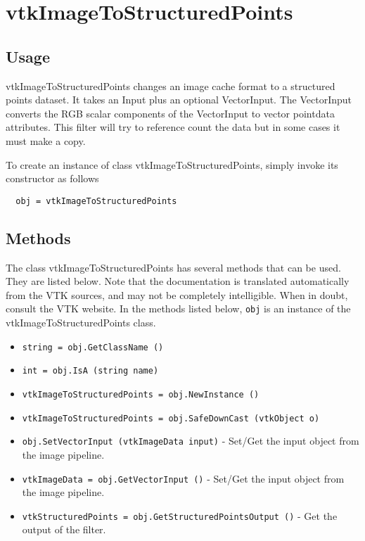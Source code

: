 \section{vtkImageToStructuredPoints}

\subsection{Usage}

 vtkImageToStructuredPoints changes an image cache format to
 a structured points dataset.  It takes an Input plus an optional
 VectorInput. The VectorInput converts the RGB scalar components
 of the VectorInput to vector pointdata attributes. This filter
 will try to reference count the data but in some cases it must
 make a copy.

To create an instance of class vtkImageToStructuredPoints, simply
invoke its constructor as follows
\begin{verbatim}
  obj = vtkImageToStructuredPoints
\end{verbatim}
\subsection{Methods}

The class vtkImageToStructuredPoints has several methods that can be used.
  They are listed below.
Note that the documentation is translated automatically from the VTK sources,
and may not be completely intelligible.  When in doubt, consult the VTK website.
In the methods listed below, \verb|obj| is an instance of the vtkImageToStructuredPoints class.
\begin{itemize}
\item  \verb|string = obj.GetClassName ()|

\item  \verb|int = obj.IsA (string name)|

\item  \verb|vtkImageToStructuredPoints = obj.NewInstance ()|

\item  \verb|vtkImageToStructuredPoints = obj.SafeDownCast (vtkObject o)|

\item  \verb|obj.SetVectorInput (vtkImageData input)| -  Set/Get the input object from the image pipeline.

\item  \verb|vtkImageData = obj.GetVectorInput ()| -  Set/Get the input object from the image pipeline.

\item  \verb|vtkStructuredPoints = obj.GetStructuredPointsOutput ()| -  Get the output of the filter.

\end{itemize}
